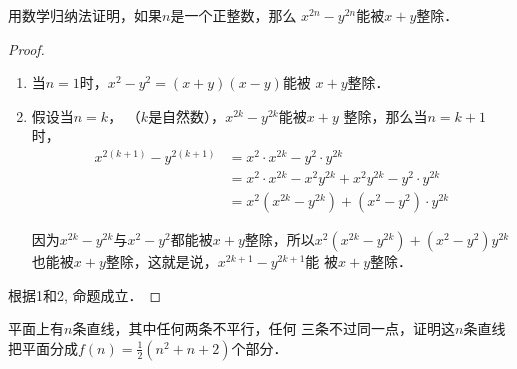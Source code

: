 \begin{example}
    用数学归纳法证明，如果$n$是一个正整数，那么
    $x^{2n}-y^{2n}$能被$x+y$整除．
\end{example}

\begin{proof}
\begin{enumerate}
    \item 当$n=1$时，$x^2-y^2=(x+y)(x-y)$能被
    $x+y$整除．
    \item 假设当$n=k$， （$k$是自然数），$x^{2k}-y^{2k}$能被$x+y$
    整除，那么当$n=k+1$时，
\[\begin{split}
    x^{2(k+1)}-y^{2(k+1)}
    &=x^2\cdot x^{2k}-y^2\cdot y^{2k}\\
    &=x^2\cdot x^{2k}-x^2y^{2k}+x^2y^{2k}-y^2\cdot y^{2k}\\
    &=x^2(x^{2k}-y^{2k})+(x^2-y^2)\cdot y^{2k}
\end{split}\]
    
    因为$x^{2k}-y^{2k}$与$x^2-y^2$都能被$x+y$整除，所以$x^2(x^{2k}-y^{2k})+(x^2-y^2)y^{2k}$也能被$x+y$整除，这就是说，$x^{2k+1}-y^{2k+1}$能
    被$x+y$整除．
\end{enumerate}  

根据1和2, 命题成立．
\end{proof}

\begin{example}
    平面上有$n$条直线，其中任何两条不平行，任何
三条不过同一点，证明这$n$条直线把平面分成$f(n)=\frac{1}{2}
(n^2+n+2)$个部分．
\end{example}

